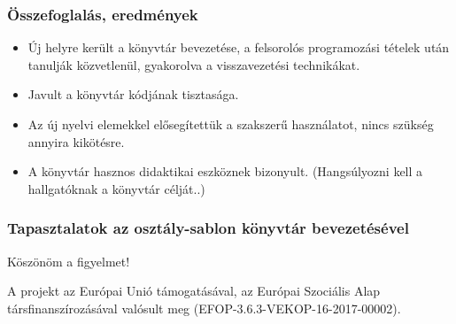 \documentclass[11pt]{beamer}
\begin{document}
\begin{frame}
	\frametitle{Összefoglalás, eredmények}
	\begin{itemize}
		\item Új helyre került a könyvtár bevezetése, a felsorolós programozási tételek után tanulják közvetlenül, gyakorolva a visszavezetési technikákat.
		\item Javult a könyvtár kódjának tisztasága.
		\item Az új nyelvi elemekkel elősegítettük a szakszerű használatot, nincs szükség annyira kikötésre.
		\item A könyvtár hasznos didaktikai eszköznek bizonyult. (Hangsúlyozni kell a hallgatóknak a könyvtár célját..)
	\end{itemize}
\end{frame}

\begin{frame}
	\frametitle{Tapasztalatok az osztály-sablon könyvtár bevezetésével}
	\begin{center}
		\Large{Köszönöm a figyelmet!}
	
	\vspace*{25px}
	{\small A projekt az Európai Unió támogatásával, az Európai Szociális Alap társfinanszírozásával valósult meg (EFOP-3.6.3-VEKOP-16-2017-00002).}\end{center}
\end{frame}
\end{document}
